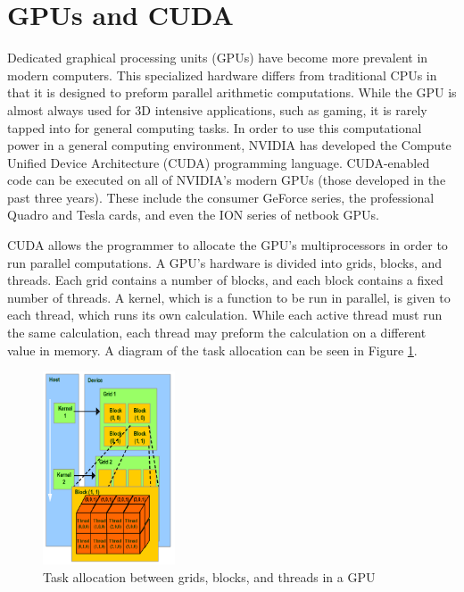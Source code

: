 \documentclass[10pt,twocolumn,twoside]{IEEEtran}
\begin{document}
\section{GPUs and CUDA}
Dedicated graphical processing units (GPUs) have become more prevalent in modern computers. This specialized 
hardware differs from traditional CPUs in that it is designed to preform parallel arithmetic computations. 
While the GPU is almost always used for 3D intensive applications, such as gaming, it is rarely tapped into 
for general computing tasks. In order to use this computational power in a general computing environment, 
NVIDIA has developed the Compute Unified Device Architecture (CUDA) programming language. CUDA-enabled code 
can be executed on all of NVIDIA's modern GPUs (those developed in the past three years). These include the 
consumer GeForce series, the professional Quadro and Tesla cards, and even the ION series of netbook GPUs. 
	
CUDA allows the programmer to allocate the GPU's multiprocessors in order to run parallel computations. A 
GPU's hardware is divided into grids, blocks, and threads. Each grid contains a number of blocks, and each 
block contains a fixed number of threads. A kernel, which is a function to be run in parallel, is given to 
each thread, which runs its own calculation. While each active thread must run the same calculation, each 
thread may preform the calculation on a different value in memory. A diagram of the task allocation can be 
seen in Figure \ref{fig:cudaBlocks}.\cite{cuda-manual}

\begin{figure}[h]
\begin{center}
\includegraphics[width=0.35\textwidth]{Images/cudaBlocks.png}
\caption{Task allocation between grids, blocks, and threads in a GPU}
\label{fig:cudaBlocks}
\end{center}
\end{figure}
\end{document}
